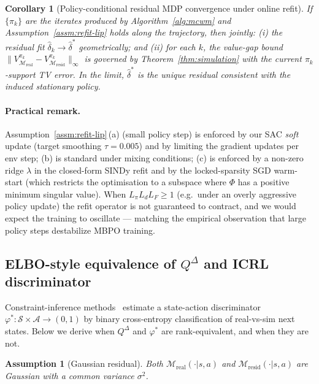 \documentclass{article}
\newtheorem{corollary}[theorem]{Corollary}
\newtheorem{assumption}{Assumption}
\theoremstyle{definition}
\newcommand{\Mreal}{\mathcal{M}_{\mathrm{real}}}
\newcommand{\Mresid}{\mathcal{M}_{\mathrm{resid}}}
\newcommand{\QD}{Q^{\Delta}}
\begin{document}
\begin{corollary}[Policy-conditional residual MDP convergence under online refit]
\label{cor:joint}
If $\{\pi_k\}$ are the iterates produced by Algorithm~\ref{alg:mcwm}
and Assumption~\ref{assm:refit-lip} holds along the trajectory, then
jointly: (i) the residual fit $\hat\delta_k \to \hat\delta^*$
geometrically; and (ii) for each $k$, the value-gap bound
$\|V^{\pi_k}_{\Mreal} - V^{\pi_k}_{\Mresid}\|_\infty$ is governed
by Theorem~\ref{thm:simulation} with the \emph{current}
$\pi_k$-support TV error.  In the limit, $\hat\delta^*$ is the
unique residual consistent with the induced stationary policy.
\end{corollary}

\paragraph{Practical remark.}  Assumption~\ref{assm:refit-lip}\,(a)
(small policy step) is enforced by our SAC \emph{soft} update
(target smoothing $\tau=0.005$) and by limiting the gradient updates
per env step; (b) is standard under mixing conditions;
(c) is enforced by a non-zero ridge $\lambda$ in the closed-form
SINDy refit and by the locked-sparsity SGD warm-start (which restricts
the optimisation to a subspace where $\Phi$ has a positive minimum
singular value).  When $L_\pi L_d L_F \ge 1$ (e.g.\ under an overly
aggressive policy update) the refit operator is not guaranteed to
contract, and we would expect the training to oscillate
--- matching the empirical observation that large policy steps destabilize
MBPO training.

\subsection{ELBO-style equivalence of $\QD$ and ICRL discriminator}

Constraint-inference methods~\cite{malik2021icrl} estimate a
state-action discriminator $\varphi^*:\mathcal S\times\mathcal A\to(0,1)$
by binary cross-entropy classification of real-vs-sim next states.
Below we derive when $\QD$ and $\varphi^*$ are rank-equivalent, and when
they are not.

\begin{assumption}[Gaussian residual]
\label{assm:gaussian}
Both $\Mreal(\cdot|s,a)$ and $\Mresid(\cdot|s,a)$ are Gaussian with a
common variance $\sigma^2$.
\end{assumption}
\end{document}

